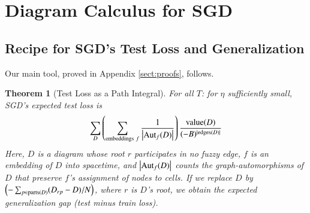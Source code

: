 \documentclass{article}
\theoremstyle{plain}
\newtheorem{thm}{Theorem}
\theoremstyle{definition}
\newcommand{\wrap}[1]{\left(#1\right)}
\newcommand{\wabs}[1]{\left|#1\right|}
\newcommand{\Aut}{\text{\textnormal{Aut}}}
\newcommand{\dvalue}{\text{\textnormal{value}}}
\newcommand{\edges}{\text{\textnormal{edges}}}
\newcommand{\parts}{\text{\textnormal{parts}}}
\begin{document}

\section{Diagram Calculus for SGD} \label{sect:calculus}

           
    \subsection{Recipe for SGD's Test Loss and Generalization}

        Our main tool, proved in Appendix \ref{sect:proofs}, follows.
        
        \begin{thm}[Test Loss as a Path Integral] \label{thm:sgdcoef}
            For all $T$: for $\eta$ sufficiently small, SGD's expected test
            loss is
            \begin{equation*}\label{eq:sgdcoef}
                \sum_{D} \wrap{
                    \sum_{\text{embeddings}~f}
                    \frac{1}{\wabs{\Aut_f(D)}}
                }
                \frac{\dvalue(D)}{(-B)^{|\edges(D)|}}
            \end{equation*}
            Here, $D$ is a diagram whose root $r$ participates in no fuzzy
            edge, $f$ is an embedding of $D$ into spacetime, and
            $\wabs{\Aut_f(D)}$ counts the graph-automorphisms of $D$ that
            preserve $f$'s assignment of nodes to cells.
            If we replace $D$ by 
            $
                \wrap{-\sum_{p \in \parts(D)} (D_{rp} - D)/N}
            $, where $r$ is $D$'s root,
            we obtain the expected generalization gap (test minus train loss).
        \end{thm}
    
\end{document}
